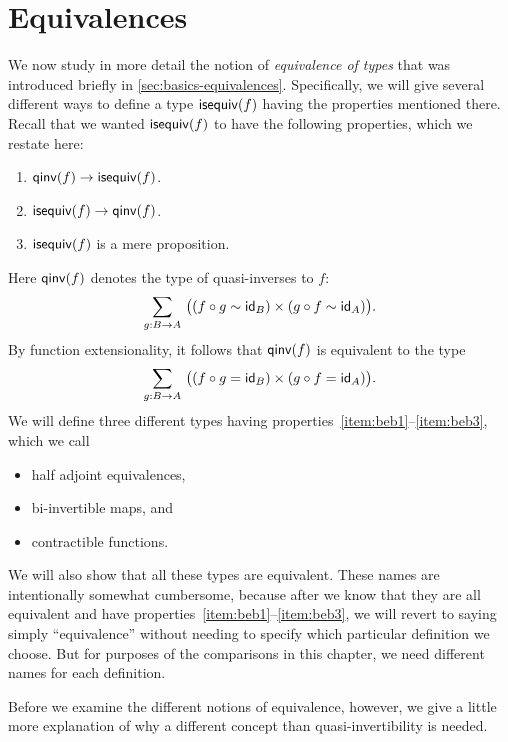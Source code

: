 \chapter{Equivalences}
\label{cha:equivalences}

We now study in more detail the notion of \emph{equivalence of types} that was introduced briefly in \cref{sec:basics-equivalences}.
Specifically, we will give several different ways to define a type $\mathsf{isequiv}(f)$ having the properties mentioned there.
Recall that we wanted $\mathsf{isequiv}(f)$ to have the following properties, which we restate here:
\begin{enumerate}
\item $\mathsf{qinv}(f) \to \mathsf{isequiv} (f)$.\label{item:beb1}
\item $\mathsf{isequiv} (f) \to \mathsf{qinv}(f)$.\label{item:beb2}
\item $\mathsf{isequiv}(f)$ is a mere proposition.\label{item:beb3}
\end{enumerate}
Here $\mathsf{qinv}(f)$ denotes the type of quasi-inverses to $f$:
\begin{equation*}
  \sm{g:B\to A} \big((f \circ g \htpy \idfunc[B]) \times (g\circ f \htpy \idfunc[A])\big).
\end{equation*}
By function extensionality, it follows that $\mathsf{qinv}(f)$ is equivalent to the type
\begin{equation*}
  \sm{g:B\to A} \big((f \circ g = \idfunc[B]) \times (g\circ f = \idfunc[A])\big).
\end{equation*}
We will define three different types having properties~\ref{item:beb1}--\ref{item:beb3}, which we call
\begin{itemize}
\item half adjoint equivalences,
\item bi-invertible maps,
  and
\item contractible functions.
\end{itemize}
We will also show that all these types are equivalent.
These names are intentionally somewhat cumbersome, because after we know that they are all equivalent and have properties~\ref{item:beb1}--\ref{item:beb3}, we will revert to saying simply ``equivalence'' without needing to specify which particular definition we choose.
But for purposes of the comparisons in this chapter, we need different names for each definition.

Before we examine the different notions of equivalence, however, we give a little more explanation of why a different concept than quasi-invertibility is needed.

